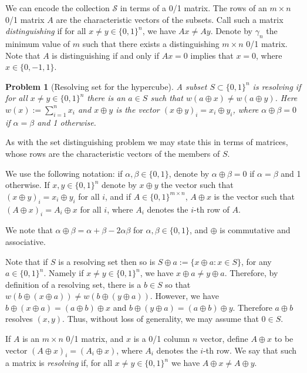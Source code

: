 \documentclass{article}
\newcommand{\cS}{\mathcal{S}}
\newtheorem{problem}{Problem}
\begin{document}
We can encode the collection $\cS$ in terms of a 0/1 matrix.  The rows
of an $m \times n$ 0/1 matrix $A$ are the characteristic vectors of
the subsets.  Call such a matrix \emph{distinguishing} if for all $x
\ne y \in \{0,1\}^n$, we have $Ax \ne Ay$.  Denote by $\gamma_n$ the
minimum value of $m$ such that there exists a distinguishing $m \times
n$ 0/1 matrix.  Note that $A$ is distinguishing if and only if $Ax =
0$ implies that $x = 0$, where $x \in \{0, -1, 1\}$.

\begin{problem}[Resolving set for the hypercube]
A subset $S \subset \{0,1\}^n$ is \emph{resolving} if for all $x \ne y
\in \{0,1\}^n$ there is an $a \in S$ such that $w(a \oplus x) \ne w(a
\oplus y)$.  Here $w(x) := \sum_{i=1}^n x_i$ and $x \oplus y$ is the
vector $(x \oplus y)_i = x_i \oplus y_i$, where $\alpha \oplus \beta =
0$ if $\alpha = \beta$ and 1 otherwise.
\end{problem}
As with the set distinguishing problem we may state this in terms of
matrices, whose rows are the characteristic vectors of the members of
$S$.

We use the following notation: if $\alpha, \beta \in \{0,1\}$, denote
by $\alpha \oplus \beta = 0$ if $\alpha = \beta$ and 1 otherwise.  If
$x, y \in \{0,1\}^n$ denote by $x \oplus y$ the vector such that $(x
\oplus y)_i = x_i \oplus y_i$ for all $i$, and if $A \in \{0,1\}^{m
  \times n}$, $A \oplus x$ is the vector such that $(A \oplus x)_i =
A_i \oplus x$ for all $i$, where $A_i$ denotes the $i$-th row of $A$. 

We note that $\alpha \oplus \beta = \alpha + \beta - 2 \alpha \beta$
for $\alpha, \beta \in \{0,1\}$, and $\oplus$ is commutative and associative.

Note that if $S$ is a resolving set then so is $S \oplus a := \{x
\oplus a : x \in S\}$, for any $a \in \{0,1\}^n$.  Namely if $x \ne y
\in \{0,1\}^n$, we have $x \oplus a \ne y \oplus a$.  Therefore, by
definition of a resolving set, there is a $b \in S$ so that $w(b
\oplus (x \oplus a)) \ne w(b \oplus (y \oplus a))$.  However, we have
$b \oplus (x \oplus a) = (a \oplus b) \oplus x$ and
$b \oplus (y \oplus a) = (a \oplus b) \oplus y$. Therefore $a \oplus
b$ resolves $(x,y)$.  Thus, without loss of generality, we may assume
that $0 \in S$.

If $A$ is an $m \times n$ 0/1 matrix, and $x$ is a 0/1 column $n$
vector, define $A \oplus x$ to be vector $(A \oplus x)_i = (A_i \oplus
x)$, where $A_i$ denotes the $i$-th row.  We say that such a matrix is
\emph{resolving} if, for all $x \ne y \in \{0,1\}^n$ we have $A \oplus
x \ne A \oplus y$.
\end{document}
